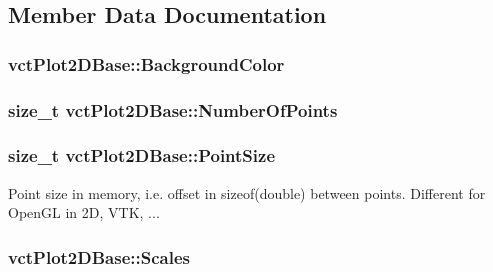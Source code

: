 \subsection{Member Data Documentation}
\hypertarget{classvct_plot2_d_base_a74038c085cabcddebdb1195dc0062ddf}{
\subsubsection[{Background\-Color}]{ vct\-Plot2\-D\-Base\-::\-Background\-Color\hspace{0.3cm}{\ttfamily [protected]}}}\label{classvct_plot2_d_base_a74038c085cabcddebdb1195dc0062ddf}
\hypertarget{classvct_plot2_d_base_af1645f053dd8310557ec4595d43516a8}{
\subsubsection[{Number\-Of\-Points}]{\setlength{\rightskip}{0pt plus 5cm}size\-\_\-t vct\-Plot2\-D\-Base\-::\-Number\-Of\-Points\hspace{0.3cm}{\ttfamily [protected]}}}\label{classvct_plot2_d_base_af1645f053dd8310557ec4595d43516a8}
\hypertarget{classvct_plot2_d_base_a4f238d9c5cefdb5c623b4967ba0e678b}{
\subsubsection[{Point\-Size}]{\setlength{\rightskip}{0pt plus 5cm}size\-\_\-t vct\-Plot2\-D\-Base\-::\-Point\-Size\hspace{0.3cm}{\ttfamily [protected]}}}\label{classvct_plot2_d_base_a4f238d9c5cefdb5c623b4967ba0e678b}
Point size in memory, i.\-e. offset in sizeof(double) between points. Different for Open\-G\-L in 2\-D, V\-T\-K, ... \hypertarget{classvct_plot2_d_base_a614a16e1e6f461d76aeba5daf4525b08}{
\subsubsection[{Scales}]{ vct\-Plot2\-D\-Base\-::\-Scales}}\label{classvct_plot2_d_base_a614a16e1e6f461d76aeba5daf4525b08}
